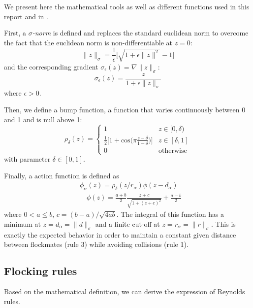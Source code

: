 We present here the mathematical tools as well as different functions used in this report and in \cite{olfati-saber_flocking_2006}. 

First, a $\sigma$\emph{-norm} is defined and replaces the standard euclidean norm to overcome the fact that the euclidean norm is non-differentiable at $z=0$:
\begin{equation}
\|z\|_{\sigma}=\frac{1}{\epsilon}\big[\sqrt{1+\epsilon\|z\|^2}-1\big]
\label{eq:sigmanorm}
\end{equation}
and the corresponding gradient $\sigma_{\epsilon}(z)=\nabla\|z\|_{\sigma}$:
\begin{equation}
\sigma_{\epsilon}(z)=\frac{z}{1+\epsilon\|z\|_{\sigma}}
\label{eq:sigmagrad}
\end{equation}
where $\epsilon>0$. 

Then, we define a bump function, a function that varies continuously between 0 and 1 and is null above 1:
\begin{equation}
\rho_{\delta}(z)=
\left\lbrace
\begin{array}{lll}
1 & z\in[0,\delta)\\
\frac{1}{2}\Big[1+\text{cos}\big(\pi\frac{z-\delta}{1-\delta}\big)\Big] & z\in[\delta,1]\\
0 & \mbox{otherwise}
\end{array}\right.
\label{eq:bump}
\end{equation}
with parameter $\delta\in[0,1]$.

Finally, a action function is defined as 
\begin{align}
&\phi_{\alpha}(z)=\rho_{\delta}(z/r_{\alpha})\phi(z-d_{\alpha}) \nonumber \\
&\quad\phi(z)=\frac{a+b}{2}\frac{z+c}{\sqrt{1+(z+c)^2}}+\frac{a-b}{2}
\label{eq:phi}
\end{align}
where $0<a\le b$, $c=(b-a)/\sqrt{4ab}$. The integral of this function has a minimum at $z=d_{\alpha}=\|d\|_{\sigma}$ and a finite cut-off at $z=r_{\alpha}=\|r\|_{\sigma}$. This is exactly the expected behavior in order to maintain a constant given distance between flockmates (rule 3) while avoiding collisions (rule 1). 

\subsection{Flocking rules}

Based on the mathematical definition, we can derive the expression of Reynolds rules. 

